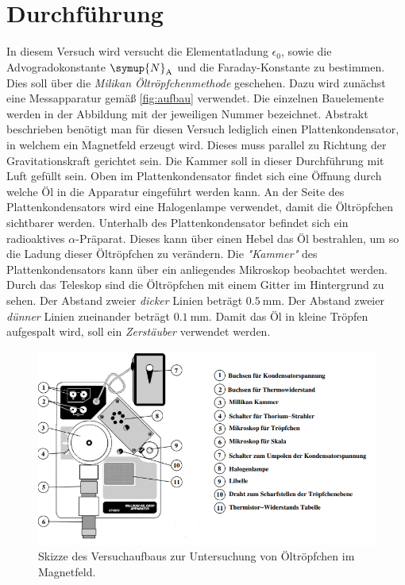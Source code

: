 \section{Durchführung}
\label{sec:Durchführung}
In diesem Versuch wird versucht die Elementatladung $\epsilon_0$, sowie die Advogradokonstante $\symup{N}_{\text{A}}$ und die Faraday-Konstante zu bestimmen. Dies soll über die 
\textit{Milikan Öltröpfchenmethode} geschehen. Dazu wird zunächst eine Messapparatur gemäß \autoref{fig:aufbau} verwendet. Die einzelnen Bauelemente werden in der Abbildung 
mit der jeweiligen Nummer bezeichnet. Abstrakt beschrieben benötigt man für diesen Versuch lediglich einen Plattenkondensator, in welchem ein Magnetfeld erzeugt wird. Dieses 
muss parallel zu Richtung der Gravitationskraft gerichtet sein. Die Kammer soll in dieser Durchführung mit Luft gefüllt sein. Oben im Plattenkondensator findet sich eine 
Öffnung durch welche Öl in die Apparatur eingeführt werden kann. An der Seite des Plattenkondensators wird eine Halogenlampe verwendet, damit die Öltröpfchen sichtbarer werden.
Unterhalb des Plattenkondensator befindet sich ein radioaktives $\alpha$-Präparat. Dieses kann über einen Hebel das Öl bestrahlen, um so die Ladung dieser Öltröpfchen zu
verändern. Die \textit{"Kammer"} des Plattenkondensators kann über ein anliegendes Mikroskop beobachtet werden. Durch das Teleskop sind die Öltröpfchen mit einem Gitter im 
Hintergrund zu sehen. Der Abstand zweier \textit{dicker} Linien beträgt $\qty{0.5}{\milli\metre}$. Der Abstand zweier \textit{dünner} Linien zueinander beträgt 
$\qty{0.1}{\milli\metre}$. Damit das Öl in kleine Tröpfen aufgespalt wird, soll ein \textit{Zerstäuber} verwendet werden.

\begin{figure}
    \centering
    \includegraphics[width = \textwidth]{content/Aufbau.PNG}
    \caption{Skizze des Versuchaufbaus zur Untersuchung von Öltröpfchen im Magnetfeld. \cite{v503}}
    \label{fig:aufbau}
\end{figure}

